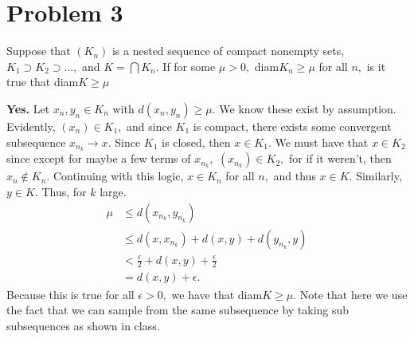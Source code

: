 \documentclass[11pt]{article}
\begin{document}
\section*{Problem 3}
\begin{problem}
    Suppose that $(K_n)$ is a nested sequence of compact nonempty sets, $K_1 \supset K_2 \supset\dots,$ and $K = \bigcap K_n.$ If for some $\mu > 0,$ diam$K_n \geq \mu$ for all $n,$ is it true that diam$K\geq \mu$
\end{problem}
\begin{solution}
    \textbf{Yes.}
    Let $x_n, y_n \in K_n$ with $d(x_n, y_n)\geq \mu.$ We know these exist by assumption. Evidently, $(x_n)\in K_1,$ and since $K_1$ is compact, there exists some convergent subsequence ${x_{n_k}} \to x.$ Since $K_1$ is closed, then $x\in K_1.$ We must have that $x \in K_2$ since except for maybe a few terms of $x_{n_k},$ $(x_{n_k})\in K_2,$ for if it weren't, then $x_n \notin K_n.$ Continuing with this logic, $x\in K_n$ for all $n,$ and thus $x\in K.$ Similarly, $y\in K.$ Thus, for $k$ large. 
    \begin{align*}
        \mu &\leq d(x_{n_k},y_{n_k})\\
        &\leq d(x, x_{n_k}) + d(x, y) + d(y_{n_k}, y)\\
        &< \frac{\epsilon}{2} + d(x,y) + \frac{\epsilon}{2}\\
        &= d(x,y) + \epsilon.
    \end{align*}
    Because this is true for all $\epsilon>0,$ we have that diam$K\geq \mu.$ Note that here we use the fact that we can sample from the same subsequence by taking sub subsequences as shown in class.
\end{solution}

\newpage
\end{document}
